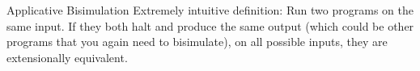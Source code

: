 \documentclass{beamer}
\begin{document}


\begin{frame}{Applicative Bisimulation}
Extremely intuitive definition: Run two programs on the same input. If
they both halt and produce the same output (which could be other
programs that you again need to bisimulate), on all possible inputs,
they are extensionally equivalent.
\end{frame}
\end{document}
